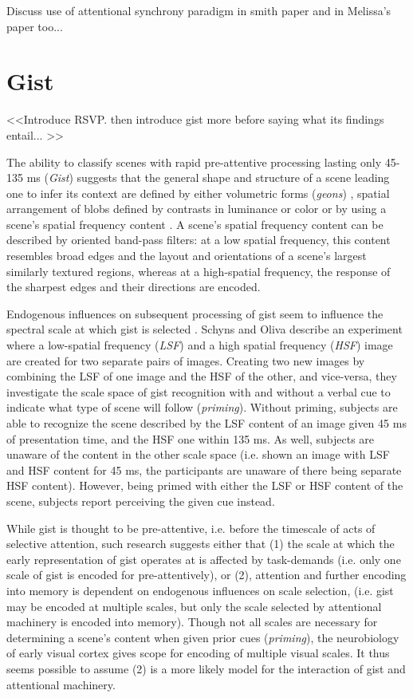 \documentclass[a4paper,10pt,final]{ThesisStyle}
\begin{document}
Discuss use of attentional synchrony paradigm in smith paper and in Melissa's paper too...

\section{Gist}
\label{sec:gist}

<<Introduce RSVP. then introduce gist more before saying what its findings entail... >>

The ability to classify scenes with rapid pre-attentive processing lasting only 45-135 ms (\textit{Gist}) \cite{Potter1969,Biederman1974,Potter1976,Schyns1994,Henderson1999} suggests that the general shape and structure of a scene leading one to infer its context are defined by either volumetric forms (\textit{geons}) \cite{Biederman1987}, spatial arrangement of blobs defined by contrasts in luminance or color \cite{Schyns1994,Oliva1997} or by using a scene's spatial frequency content \cite{Oliva2001,Oliva2005}.  A scene's spatial frequency content can be described by oriented band-pass filters: at a low spatial frequency, this content resembles broad edges and the layout and orientations of a scene's largest similarly textured regions, whereas at a high-spatial frequency, the response of the sharpest edges and their directions are encoded.  

Endogenous influences on subsequent processing of gist seem to influence the spectral scale at which gist is selected \cite{Schyns1994,Oliva1997}.  Schyns and Oliva describe an experiment where a low-spatial frequency (\textit{LSF}) and a high spatial frequency (\textit{HSF}) image are created for two separate pairs of images.  Creating two new images by combining the LSF of one image and the HSF of the other, and vice-versa, they investigate the scale space of gist recognition with and without a verbal cue to indicate what type of scene will follow (\textit{priming}).  Without priming, subjects are able to recognize the scene described by the LSF content of an image given 45 ms of presentation time, and the HSF one within 135 ms.  As well, subjects are unaware of the content in the other scale space (i.e. shown an image with LSF and HSF content for 45 ms, the participants are unaware of there being separate HSF content).  However, being primed with either the LSF or HSF content of the scene, subjects report perceiving the given cue instead.  

While gist is thought to be pre-attentive, i.e. before the timescale of acts of selective attention, such research suggests either that (1) the scale at which the early representation of gist operates at is affected by task-demands (i.e. only one scale of gist is encoded for pre-attentively), or (2), attention and further encoding into memory is dependent on endogenous influences on scale selection, (i.e. gist may be encoded at multiple scales, but only the scale selected by attentional machinery is encoded into memory).  Though not all scales are necessary for determining a scene's content when given prior cues (\textit{priming}), the neurobiology of early visual cortex gives scope for encoding of multiple visual scales.  It thus seems possible to assume (2) is a more likely model for the interaction of gist and attentional machinery.
\end{document}
